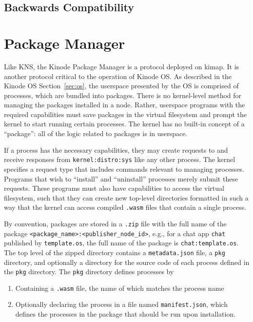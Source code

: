 \documentclass[runningheads]{llncs}
\begin{document}
\subsection{Backwards Compatibility}
\label{sec:osbackwardscompat}

\section{Package Manager}
\label{sec:packagemanager}

Like KNS, the Kinode Package Manager is a protocol deployed on kimap.
It is another protocol critical to the operation of Kinode OS.
As described in the Kinode OS Section~\ref{sec:os}, the userspace presented by the OS is comprised of processes, which are bundled into packages.
There is no kernel-level method for managing the packages installed in a node.
Rather, userspace programs with the required capabilities must save packages in the virtual filesystem and prompt the kernel to start running certain processes.
The kernel has no built-in concept of a ``package'': all of the logic related to packages is in userspace.

If a process has the necessary capabilities, they may create requests to and receive responses from \verb|kernel:distro:sys| like any other process.
The kernel specifies a request type that includes commands relevant to managing processes.
Programs that wish to ``install'' and ``uninstall'' processes merely submit these requests.
These programs must also have capabilities to access the virtual filesystem, such that they can create new top-level directories formatted in such a way that the kernel can access compiled \verb|.wasm| files that contain a single process.

By convention, packages are stored in a \verb|.zip| file with the full name of the package \verb|<package_name>:<publisher_node_id>|, e.g., for a chat app \verb|chat| published by \verb|template.os|, the full name of the package is \verb|chat:template.os|.
The top level of the zipped directory contains a \verb|metadata.json| file, a \verb|pkg| directory, and optionally a directory for the source code of each process defined in the \verb|pkg| directory.
The \verb|pkg| directory defines processes by
\begin{enumerate}
    \item Containing a \verb|.wasm| file, the name of which matches the process name
    \item Optionally declaring the process in a file named \verb|manifest.json|, which defines the processes in the package that should be run upon installation.
\end{enumerate}
\end{document}
